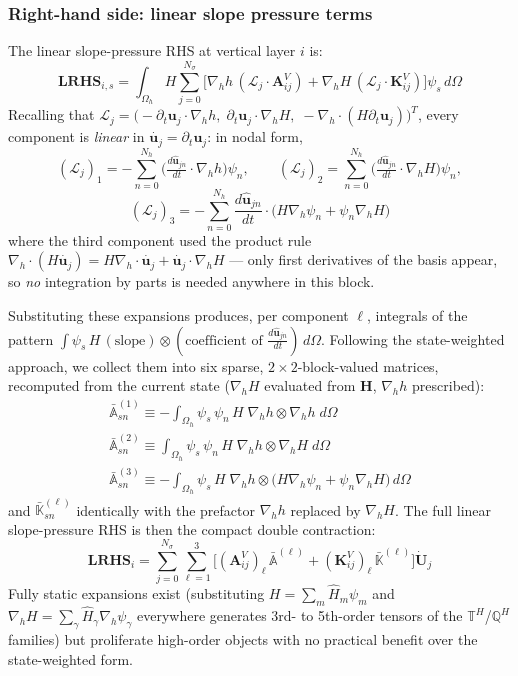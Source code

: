 \documentclass{article}
\newcommand{\Ns}{N_\sigma}
\newcommand{\uj}{\mathbf{u}_j}
\newcommand{\sumj}{\sum_{j=0}^{\Ns}}
\newcommand{\nablah}{\nabla_h}
\newcommand{\VAij}{\mathbf{A}_{ij}^V}
\newcommand{\VKij}{\mathbf{K}_{ij}^V}
\newcommand{\Nh}{N_h}
\newcommand{\sumNhn}{\sum_{n=0}^{\Nh}}
\newcommand{\uhjn}{\hat{\mathbf{u}}_{jn}}
\newcommand{\Hm}{\hat{H}_m}
\newcommand{\Hvec}{\mathbf{H}}
\begin{document}
\subsubsection*{Right-hand side: linear slope pressure terms}

The linear slope-pressure RHS at vertical layer $i$ is:
$$\mathbf{LRHS}_{i,s} = \int_{\Omega_h}H\sumj\Big[\nablah h\,(\mathcal{L}_j\cdot\VAij) + \nablah H\,(\mathcal{L}_j\cdot\VKij)\Big]\psi_s\,d\Omega$$
Recalling that $\mathcal{L}_j = \big(-\partial_t\uj\cdot\nablah h,\; \partial_t\uj\cdot\nablah H,\; -\nablah\cdot(H\partial_t\uj)\big)^T$, every component is \emph{linear} in $\dot{\uj} = \partial_t\uj$: in nodal form,
$$(\mathcal{L}_j)_1 = -\sumNhn \big(\tfrac{d\uhjn}{dt}\cdot\nablah h\big)\psi_n, \qquad
(\mathcal{L}_j)_2 = \sumNhn \big(\tfrac{d\uhjn}{dt}\cdot\nablah H\big)\psi_n,$$
$$(\mathcal{L}_j)_3 = -\sumNhn \frac{d\uhjn}{dt}\cdot\big( H\nablah\psi_n + \psi_n\nablah H \big)$$
where the third component used the product rule $\nablah\cdot(H\dot{\uj}) = H\nablah\cdot\dot{\uj} + \dot{\uj}\cdot\nablah H$ — only first derivatives of the basis appear, so \emph{no} integration by parts is needed anywhere in this block.

Substituting these expansions produces, per component $\ell$, integrals of the pattern $\int\psi_s\,H\,(\text{slope})\otimes(\text{coefficient of }\tfrac{d\uhjn}{dt})\,d\Omega$. Following the state-weighted approach, we collect them into six sparse, $2\times2$-block-valued matrices, recomputed from the current state ($\nablah H$ evaluated from $\Hvec$, $\nablah h$ prescribed):
\begin{subequations}
\begin{align}
    \boxed{\bar{\mathbb{A}}^{(1)}_{sn} \equiv -\int_{\Omega_h}\psi_s\,\psi_n\,H\;\nablah h\otimes\nablah h\;d\Omega}\\[2pt]
    \boxed{\bar{\mathbb{A}}^{(2)}_{sn} \equiv \int_{\Omega_h}\psi_s\,\psi_n\,H\;\nablah h\otimes\nablah H\;d\Omega}\\[2pt]
    \boxed{\bar{\mathbb{A}}^{(3)}_{sn} \equiv -\int_{\Omega_h}\psi_s\,H\;\nablah h\otimes\big(H\nablah\psi_n + \psi_n\nablah H\big)\,d\Omega}
\end{align}
\label{eq: def state weighted linear pressure operators}
\end{subequations}
and $\bar{\mathbb{K}}^{(\ell)}_{sn}$ identically with the prefactor $\nablah h$ replaced by $\nablah H$. The full linear slope-pressure RHS is then the compact double contraction:
\begin{equation}
    \mathbf{LRHS}_{i} = \sumj\sum_{\ell=1}^{3}\Big[(\VAij)_\ell\,\bar{\mathbb{A}}^{(\ell)} + (\VKij)_\ell\,\bar{\mathbb{K}}^{(\ell)}\Big]\dot{\mathbf{U}}_j
    \label{eq: discrete linear RHS}
\end{equation}
Fully static expansions exist (substituting $H=\sum_m\Hm\psi_m$ and $\nablah H = \sum_\gamma\hat H_\gamma\nablah\psi_\gamma$ everywhere generates 3rd- to 5th-order tensors of the $\mathbb{T}^H$/$\mathbb{Q}^H$ families) but proliferate high-order objects with no practical benefit over the state-weighted form.
 
\end{document}
